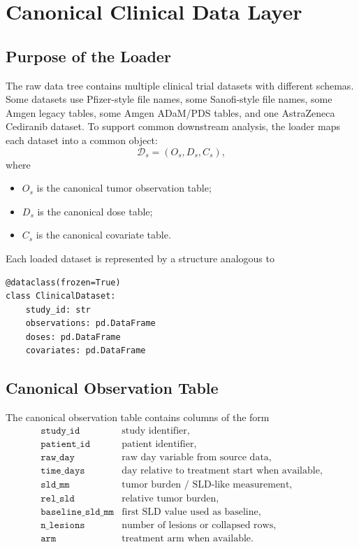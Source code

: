 \documentclass[11pt,a4paper]{article}
\begin{document}
\section{Canonical Clinical Data Layer}

\subsection{Purpose of the Loader}

The raw data tree contains multiple clinical trial datasets with different schemas. Some datasets use Pfizer-style file names, some Sanofi-style file names, some Amgen legacy tables, some Amgen ADaM/PDS tables, and one AstraZeneca Cediranib dataset. To support common downstream analysis, the loader maps each dataset into a common object:
\[
    \mathcal{D}_s
    = (O_s, D_s, C_s),
\]
where
\begin{itemize}[leftmargin=2em]
    \item $O_s$ is the canonical tumor observation table;
    \item $D_s$ is the canonical dose table;
    \item $C_s$ is the canonical covariate table.
\end{itemize}

Each loaded dataset is represented by a structure analogous to
\begin{lstlisting}
@dataclass(frozen=True)
class ClinicalDataset:
    study_id: str
    observations: pd.DataFrame
    doses: pd.DataFrame
    covariates: pd.DataFrame
\end{lstlisting}

\subsection{Canonical Observation Table}

The canonical observation table contains columns of the form
\[
\begin{array}{ll}
\texttt{study\_id} & \text{study identifier},\\
\texttt{patient\_id} & \text{patient identifier},\\
\texttt{raw\_day} & \text{raw day variable from source data},\\
\texttt{time\_days} & \text{day relative to treatment start when available},\\
\texttt{sld\_mm} & \text{tumor burden / SLD-like measurement},\\
\texttt{rel\_sld} & \text{relative tumor burden},\\
\texttt{baseline\_sld\_mm} & \text{first SLD value used as baseline},\\
\texttt{n\_lesions} & \text{number of lesions or collapsed rows},\\
\texttt{arm} & \text{treatment arm when available}.
\end{array}
\]
\end{document}
